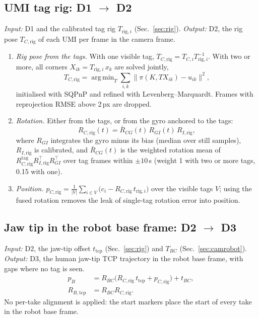 \documentclass[conference,10pt]{IEEEtran}
\DeclareMathOperator*{\argmin}{arg\,min}
\begin{document}
\subsection{UMI tag rig: D1 $\to$ D2}\label{sec:rigpose}
\emph{Input:} D1 and the calibrated tag rig $T_{\mathrm{rig},i}$ (Sec.~\ref{sec:rig}). \emph{Output:} D2, the rig pose
$T_{C,\mathrm{rig}}$ of each UMI per frame in the camera frame.
\begin{enumerate}
\item \emph{Rig pose from the tags.} With one visible tag, $T_{C,\mathrm{rig}}=T_{C,i}T_{\mathrm{rig},i}^{-1}$. With two or
  more, all corners $X_{ik}=T_{\mathrm{rig},i}\,x_k$ are solved jointly,
  \begin{equation}
  T_{C,\mathrm{rig}}=\argmin_{T}\sum_{i,k}\lVert \pi(K,T X_{ik})-u_{ik}\rVert^2,
  \end{equation}
  initialised with SQPnP and refined with Levenberg--Marquardt. Frames with reprojection RMSE above 2\,px are dropped.
\item \emph{Rotation.} Either from the tags, or from the gyro anchored to the tags:
  \begin{equation}
  R_{C,\mathrm{rig}}(t)=\bar R_{CG}(t)\,R_{GI}(t)\,R_{I,\mathrm{rig}},
  \end{equation}
  where $R_{GI}$ integrates the gyro minus its bias (median over still samples), $R_{I,\mathrm{rig}}$ is calibrated, and
  $\bar R_{CG}(t)$ is the weighted rotation mean of $R^\mathrm{tag}_{C,\mathrm{rig}}R_{I,\mathrm{rig}}^\top R_{GI}^\top$
  over tag frames within $\pm10$\,s (weight 1 with two or more tags, 0.15 with one).
\item \emph{Position.} $p_{C,\mathrm{rig}}=\frac{1}{|V|}\sum_{i\in V}\big(c_i-R_{C,\mathrm{rig}}\,t_{\mathrm{rig},i}\big)$
  over the visible tags $V$; using the fused rotation removes the leak of single-tag rotation error into position.
\end{enumerate}

\subsection{Jaw tip in the robot base frame: D2 $\to$ D3}\label{sec:tcp}
\emph{Input:} D2, the jaw-tip offset $t_\mathrm{tcp}$ (Sec.~\ref{sec:rig}) and $T_{BC}$ (Sec.~\ref{sec:camrobot}).
\emph{Output:} D3, the human jaw-tip TCP trajectory in the robot base frame, with gaps where no tag is seen.
\begin{align}
p_B&=R_{BC}\big(R_{C,\mathrm{rig}}\,t_\mathrm{tcp}+p_{C,\mathrm{rig}}\big)+t_{BC},\\
R_{B,\mathrm{tcp}}&=R_{BC}R_{C,\mathrm{rig}}.
\end{align}
No per-take alignment is applied: the start markers place the start of every take in the robot base frame.
\end{document}
